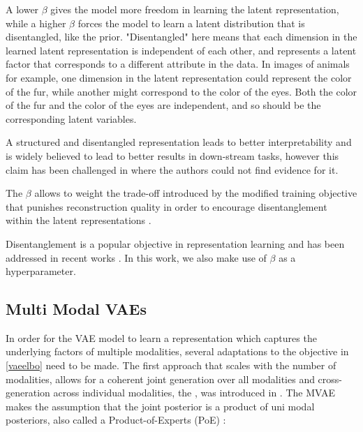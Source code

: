 A lower $\beta$ gives the model more freedom in learning the latent representation, while a higher $\beta$ forces the model to learn a latent distribution that is disentangled, like the prior.
"Disentangled" here means that each dimension in the learned latent representation is independent of each other, and represents a latent factor that corresponds to a different attribute in the data.
In images of animals for example, one dimension in the latent representation could represent the color of the fur, while another might correspond to the color of the eyes.
Both the color of the fur and the color of the eyes are independent, and so should be the corresponding latent variables.

A structured and disentangled representation leads to better interpretability and is widely believed to lead to better results in down-stream tasks, however this claim has been challenged in %
where the authors could not find evidence for it.

The $\beta$ allows to weight the trade-off introduced by the modified training objective that punishes reconstruction quality in order to encourage disentanglement within the latent representations \citep{burgess_understanding_2018}.



Disentanglement is a popular objective in representation learning and has been addressed in recent works \parencite{chen_isolating_2019, locatello_challenging_2019}.
In this work, we also make use of $\beta$ as a hyperparameter.

\subsection{Multi Modal VAEs}
In order for the VAE model to learn a representation which captures the underlying factors of multiple modalities, several adaptations to the objective in \cref{vaeelbo} need to be made.
The first approach that scales with the number of modalities, allows for a coherent joint generation over all modalities and cross-generation across individual modalities, the , was introduced in \cite{poe}.
The MVAE makes the assumption that the joint posterior is a product of uni modal posteriors, also called a Product-of-Experts (PoE) \parencite{hinton_training_2002}:

